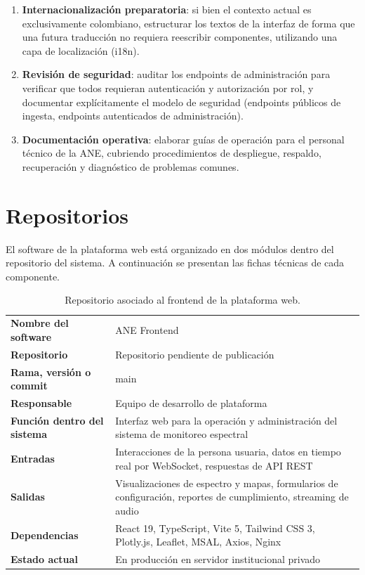 \begin{enumerate}
    \item \textbf{Internacionalización preparatoria}: si bien el contexto
    actual es exclusivamente colombiano, estructurar los textos de la interfaz
    de forma que una futura traducción no requiera reescribir componentes,
    utilizando una capa de localización (i18n).

    \item \textbf{Revisión de seguridad}: auditar los endpoints de
    administración para verificar que todos requieran autenticación y
    autorización por rol, y documentar explícitamente el modelo de seguridad
    (endpoints públicos de ingesta, endpoints autenticados de administración).

    \item \textbf{Documentación operativa}: elaborar guías de operación para
    el personal técnico de la ANE, cubriendo procedimientos de despliegue,
    respaldo, recuperación y diagnóstico de problemas comunes.
\end{enumerate}

\section{Repositorios}

El software de la plataforma web está organizado en dos módulos dentro del
repositorio del sistema. A continuación se presentan las fichas técnicas de
cada componente.

\begin{table}[H]
\centering
\caption{Repositorio asociado al frontend de la plataforma web.}
\label{tab:repo_frontend}
\begin{tabularx}{\textwidth}{>{\bfseries}l X}
\toprule
Nombre del software & ANE Frontend \\
Repositorio & Repositorio pendiente de publicación \\
Rama, versión o commit & main \\
Responsable & Equipo de desarrollo de plataforma \\
Función dentro del sistema & Interfaz web para la operación y administración
del sistema de monitoreo espectral \\
Entradas & Interacciones de la persona usuaria, datos en tiempo real por
WebSocket, respuestas de API REST \\
Salidas & Visualizaciones de espectro y mapas, formularios de configuración,
reportes de cumplimiento, streaming de audio \\
Dependencias & React 19, TypeScript, Vite 5, Tailwind CSS 3, Plotly.js,
Leaflet, MSAL, Axios, Nginx \\
Estado actual & En producción en servidor institucional privado \\
\bottomrule
\end{tabularx}
\end{table}

